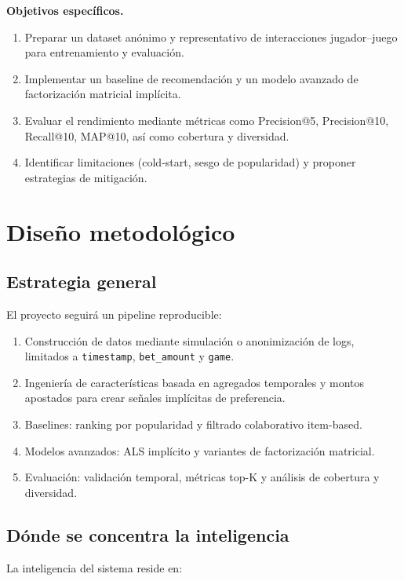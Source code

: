 \documentclass[12pt,a4paper]{article}
\begin{document}
\textbf{Objetivos específicos.}

\begin{enumerate}
    \item Preparar un dataset anónimo y representativo de interacciones jugador--juego para entrenamiento y evaluación.
    \item Implementar un baseline de recomendación y un modelo avanzado de factorización matricial implícita.
    \item Evaluar el rendimiento mediante métricas como Precision@5, Precision@10, Recall@10, MAP@10, así como cobertura y diversidad.
    \item Identificar limitaciones (cold-start, sesgo de popularidad) y proponer estrategias de mitigación.
\end{enumerate}
\section{Diseño metodológico}

\subsection{Estrategia general}

El proyecto seguirá un pipeline reproducible:

\begin{enumerate}
    \item Construcción de datos mediante simulación o anonimización de logs, limitados a \texttt{timestamp}, \texttt{bet\_amount} y \texttt{game}.
    \item Ingeniería de características basada en agregados temporales y montos apostados para crear señales implícitas de preferencia.
    \item Baselines: ranking por popularidad y filtrado colaborativo item-based.
    \item Modelos avanzados: ALS implícito y variantes de factorización matricial.
    \item Evaluación: validación temporal, métricas top-K y análisis de cobertura y diversidad.
\end{enumerate}

\subsection{Dónde se concentra la inteligencia}

La inteligencia del sistema reside en:
\end{document}
